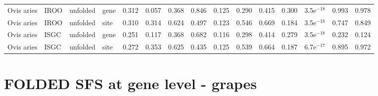 \begin{longtable}{llllrrrrrrrrrrr}
          Ovis aries &                      IROO &  unfolded &  gene &                              0.312 &                               0.057 &                 0.368 &                 0.846 &                              0.125 &                               0.290 &                 0.415 &                 0.300 & 3.5e$^{-18}$ &  0.993 &  0.978 \\
          Ovis aries &                      IROO &  unfolded &  site &                              0.310 &                               0.314 &                 0.624 &                 0.497 &                              0.123 &                               0.546 &                 0.669 &                 0.184 & 3.5e$^{-18}$ &  0.747 &  0.849 \\
          Ovis aries &                      ISGC &  unfolded &  gene &                              0.251 &                               0.117 &                 0.368 &                 0.682 &                              0.116 &                               0.298 &                 0.414 &                 0.279 & 3.5e$^{-18}$ &  0.232 &  0.124 \\
          Ovis aries &                      ISGC &  unfolded &  site &                              0.272 &                               0.353 &                 0.625 &                 0.435 &                              0.125 &                               0.539 &                 0.664 &                 0.187 & 6.7e$^{-17}$ &  0.895 &  0.972 \\
\end{longtable}
\newpage\section*{FOLDED SFS at gene level - grapes} 
